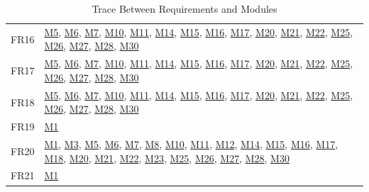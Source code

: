 \documentclass[12pt, titlepage]{article}
\begin{document}
\begin{table}[H]
\begin{tabular}{p{} p{}}
FR16 & \hyperref[m5]{M5}, \hyperref[m6]{M6}, \hyperref[m7]{M7}, \hyperref[m10]{M10}, \hyperref[m11]{M11}, \hyperref[m14]{M14}, \hyperref[m15]{M15}, \hyperref[m16]{M16}, \hyperref[m17]{M17}, \hyperref[m20]{M20}, \hyperref[m21]{M21}, \hyperref[m22]{M22}, \hyperref[m25]{M25}, \hyperref[m26]{M26}, \hyperref[m27]{M27}, \hyperref[m28]{M28}, \hyperref[m30]{M30}\\
FR17 & \hyperref[m5]{M5}, \hyperref[m6]{M6}, \hyperref[m7]{M7}, \hyperref[m10]{M10}, \hyperref[m11]{M11}, \hyperref[m14]{M14}, \hyperref[m15]{M15}, \hyperref[m16]{M16}, \hyperref[m17]{M17}, \hyperref[m20]{M20}, \hyperref[m21]{M21}, \hyperref[m22]{M22}, \hyperref[m25]{M25}, \hyperref[m26]{M26}, \hyperref[m27]{M27}, \hyperref[m28]{M28}, \hyperref[m30]{M30}\\
FR18 & \hyperref[m5]{M5}, \hyperref[m6]{M6}, \hyperref[m7]{M7}, \hyperref[m10]{M10}, \hyperref[m11]{M11}, \hyperref[m14]{M14}, \hyperref[m15]{M15}, \hyperref[m16]{M16}, \hyperref[m17]{M17}, \hyperref[m20]{M20}, \hyperref[m21]{M21}, \hyperref[m22]{M22}, \hyperref[m25]{M25}, \hyperref[m26]{M26}, \hyperref[m27]{M27}, \hyperref[m28]{M28}, \hyperref[m30]{M30}\\
FR19 & \hyperref[m1]{M1}\\
FR20 & \hyperref[m1]{M1}, \hyperref[m3]{M3}, \hyperref[m5]{M5}, \hyperref[m6]{M6}, \hyperref[m7]{M7}, \hyperref[m8]{M8}, \hyperref[m10]{M10}, \hyperref[m11]{M11}, \hyperref[m12]{M12}, \hyperref[m14]{M14}, \hyperref[m15]{M15}, \hyperref[m16]{M16}, \hyperref[m17]{M17}, \hyperref[m18]{M18}, \hyperref[m20]{M20}, \hyperref[m21]{M21}, \hyperref[m22]{M22}, \hyperref[m23]{M23}, \hyperref[m25]{M25}, \hyperref[m26]{M26}, \hyperref[m27]{M27}, \hyperref[m28]{M28}, \hyperref[m30]{M30}\\
FR21 & \hyperref[m1]{M1}\\
\bottomrule
\end{tabular}
\caption{Trace Between Requirements and Modules}
\label{TblRT}
\end{table}
\end{document}
